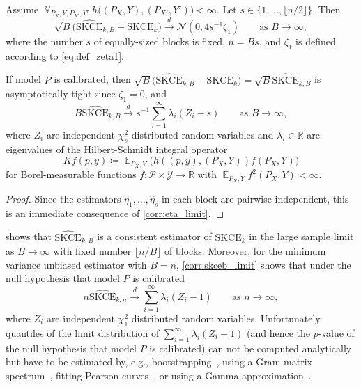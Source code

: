 \documentclass{article}
\DeclareMathOperator{\Exp}{\mathbb{E}}
\DeclareMathOperator{\Var}{\mathbb{V}}
\begin{document}
\begin{corollary}\label{corr:skceb_limit}
Assume $\Var_{P_X,Y,P_{X'},Y'} h\big((P_X, Y), (P_{X'}, Y')\big) < \infty$.
Let $s \in \{1, \ldots, \lfloor n / 2 \rfloor \}$. Then
\begin{equation*}
    \sqrt{B} \big(\widehat{\mathrm{SKCE}}_{k,B} - \mathrm{SKCE}_k\big)
    \xrightarrow{d} \mathcal{N}(0, 4 s^{-1} \zeta_1) \qquad \text{as } B \to \infty,
\end{equation*}
where the number $s$ of equally-sized blocks is fixed, $n = Bs$, 
and $\zeta_1$ is defined according to \cref{eq:def_zeta1}.

If model $P$ is calibrated, then
$\sqrt{B}\big(\widehat{\mathrm{SKCE}}_{k,B} - \mathrm{SKCE}_k\big)
= \sqrt{B} \widehat{\mathrm{SKCE}}_{k,B}$ is
asymptotically tight since $\zeta_1 = 0$, and
\begin{equation*}
    B \widehat{\mathrm{SKCE}}_{k,B} \xrightarrow{d} s^{-1} \sum_{i=1}^\infty \lambda_i (Z_{i} - s) \qquad \text{as } B \to \infty,
\end{equation*}
where $Z_{i} $ are independent $\chi^2_s$ distributed random variables
and $\lambda_i \in \mathbb{R}$ are eigenvalues of the Hilbert-Schmidt integral
operator
\begin{equation*}
    K f(p, y) \coloneqq \Exp_{P_X,Y}\big(h((p, y), (P_X, Y)) f(P_X, Y)\big)
\end{equation*}
for Borel-measurable functions
$f \colon \mathcal{P} \times \mathcal{Y} \to \mathbb{R}$
with $\Exp_{P_X,Y} f^2(P_X, Y) < \infty$.
\end{corollary}

\begin{proof}
Since the estimators $\widehat{\eta}_1, \ldots, \widehat{\eta}_{s}$ in each block are
pairwise independent, this is an immediate consequence of \cref{corr:eta_limit}.
\end{proof}

\begin{remark}\label{remark:skceb_quadratic}
 shows that $\widehat{\mathrm{SKCE}}_{k,B}$ is a consistent
estimator of $\mathrm{SKCE}_k$ in the large sample limit as $B \to \infty$ with
fixed number $\lfloor n / B \rfloor$ of blocks. Moreover, for the minimum variance
unbiased estimator with $B = n$, \cref{corr:skceb_limit}
shows that under the null hypothesis that model $P$ is calibrated
\begin{equation*}
    n \widehat{\mathrm{SKCE}}_{k,n} \xrightarrow{d} \sum_{i=1}^\infty \lambda_i (Z_{i} - 1) \qquad \text{as } n \to \infty,
\end{equation*}
where $Z_i$ are independent $\chi^2_1$ distributed random variables. Unfortunately
quantiles of the limit distribution of $\sum_{i=1}^\infty \lambda_i (Z_{i} - 1)$
(and hence the $p$-value of the null hypothesis that model $P$ is calibrated) can not
be computed analytically but have to be estimated by, e.g.,
bootstrapping~\citep{Arcones1992}, using a Gram matrix spectrum~\citep{Gretton2009},
fitting Pearson curves~\citep{Gretton2007}, or using a Gamma
approximation~\citep[p.~343, p.~359]{Johnson1994}.

\end{remark}
\end{document}
